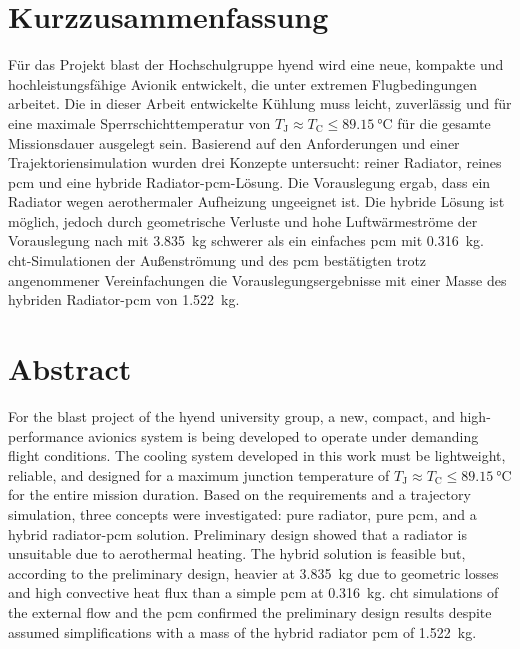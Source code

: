 \chapter*{Kurzzusammenfassung} %
\label{chap:Kurzzusammenfassung}


Für das Projekt \ac{blast} der Hochschulgruppe \ac{hyend} wird eine neue, kompakte und hochleistungsfähige Avionik entwickelt,
die unter extremen Flugbedingungen arbeitet. Die in dieser Arbeit entwickelte Kühlung muss leicht, zuverlässig und für eine
maximale Sperrschichttemperatur von $T_\mathrm{J} \approx T_\mathrm{C} \leq \SI{89.15}{\celsius}$ für die gesamte Missionsdauer ausgelegt sein.
Basierend auf den Anforderungen und einer Trajektoriensimulation
wurden drei Konzepte untersucht: reiner Radiator, reines \ac{pcm} und eine hybride Radiator-\ac{pcm}-Lösung. Die Vorauslegung
ergab, dass ein Radiator wegen aerothermaler Aufheizung ungeeignet ist. Die hybride Lösung ist möglich, jedoch durch geometrische
Verluste und hohe Luftwärmeströme der Vorauslegung nach mit \SI{3.835}{\kilogram} schwerer als ein einfaches \ac{pcm}
mit \SI{0.316}{\kilogram}. \ac{cht}-Simulationen der Außenströmung und des \ac{pcm}
bestätigten trotz angenommener Vereinfachungen die Vorauslegungsergebnisse mit einer Masse des hybriden Radiator-\ac{pcm} von \SI{1.522}{\kilogram}.

\chapter*{Abstract} %
\label{chap:Abstract}
For the \ac{blast} project of the \ac{hyend} university group, a new, compact, and high-performance avionics system is being developed to
operate under demanding flight conditions. The cooling system developed in this work must be lightweight, reliable, and designed for a maximum
junction temperature of $T_\mathrm{J} \approx T_\mathrm{C} \leq \SI{89.15}{\celsius}$ for the entire mission duration.
Based on the requirements and a trajectory simulation, three concepts were investigated: pure radiator, pure \ac{pcm}, and a hybrid radiator-\ac{pcm}
solution. Preliminary design showed that a radiator is unsuitable due to aerothermal heating. The hybrid solution is feasible but, according to
the preliminary design, heavier at \SI{3.835}{\kilogram} due to geometric losses and high convective heat flux than a simple \ac{pcm} at
\SI{0.316}{\kilogram}. \ac{cht} simulations of the external flow and the \ac{pcm} confirmed the preliminary design results despite assumed
simplifications with a mass of the hybrid radiator \ac{pcm} of \SI{1.522}{\kilogram}.